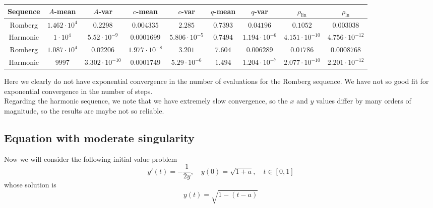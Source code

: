 \begin{table}[H]
    \centering
    \small
    \begin{tabular}{c||c|c|c|c|c|c|c|c}
Sequence & \(A\)-mean & \(A\)-var & \(c\)-mean & \(c\)-var & \(q\)-mean & \(q\)-var & \(\rho_{\operatorname{lin}}\) & \(\rho_{\ln}\)\\\hline
\rowcolor{red}
Romberg & \(1.462\cdot 10^4\) & \(0.2298\) & \(0.004335\) & \(2.285\) & \(0.7393\) & \(0.04196\) & \(0.1052\) & \(0.003038\) \\
\rowcolor{yellow}
Harmonic & \(1\cdot 10^4\) & \(5.52\cdot 10^{-9}\) & \(0.0001699\) & \(5.806\cdot 10^{-5}\) & \(0.7494\) & \(1.194\cdot 10^{-6}\) & \(4.151\cdot 10^{-10}\) & \(4.756\cdot 10^{-12}\) \\
\rowcolor{yellow}
Romberg & \(1.087\cdot 10^4\) & \(0.02206\) & \(1.977\cdot 10^{-8}\) & \(3.201\) & \(7.604\) & \(0.006289\) & \(0.01786\) & \(0.0008768\) \\
\rowcolor{yellow}
Harmonic & \(9997\) & \(3.302\cdot 10^{-10}\) & \(0.0001749\) & \(5.29\cdot 10^{-6}\) & \(1.494\) & \(1.204\cdot 10^{-7}\) & \(2.077\cdot 10^{-10}\) & \(2.201\cdot 10^{-12}\) \\
    \end{tabular}
    \label{tab:my_label}
\end{table}

Here we clearly do not have exponential convergence in the number of evaluations for the Romberg sequence. We have not so good fit for exponential convergence in the number of steps.\\

Regarding the harmonic sequence, we note that we have extremely slow convergence, so the \(x\) and \(y\) values differ by many orders of magnitude, so the results are maybe not so reliable.

\subsection{Equation with moderate singularity}

Now we will consider the following initial value problem
\begin{equation}
y'(t) = -\frac{1}{2y}, \quad y(0) = \sqrt{1+a},\quad t\in [0,1]\label{47}
\end{equation}
whose solution is 
\[
y(t) = \sqrt{1 - (t-a)}
\]

